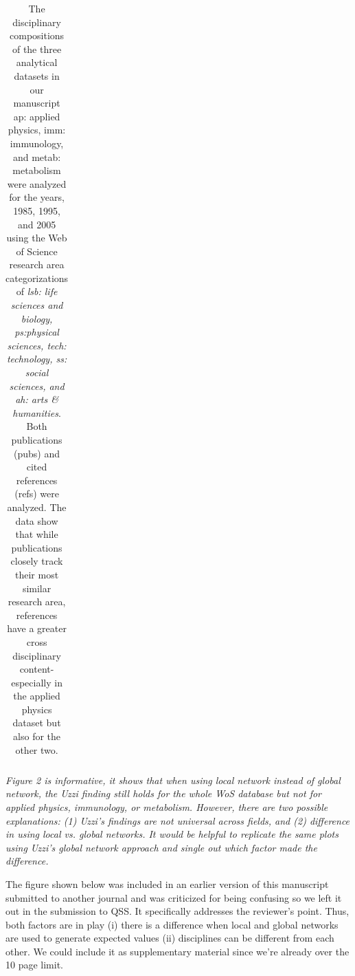 \documentclass[11pt, oneside]{article}   	%
\begin{document}
\begin{table}[ht!]
{\begin{tabular}{|r rllrrrrrrr r|}
   \hline
\end{tabular}
}
\caption{The disciplinary compositions of the three analytical datasets in our manuscript ap: applied physics, imm: immunology, and metab: metabolism were analyzed for the years, 1985, 1995, and 2005 using the Web of Science research area categorizations of \emph{lsb: life sciences and biology, ps:physical sciences, tech: technology, ss: social sciences, and ah: arts \& humanities}. Both publications (pubs) and cited references (refs) were analyzed. The data show that while publications closely track their most similar research area, references have a greater cross disciplinary content- especially in the applied physics dataset but also for the other two. }
\end{table}

\newpage

\emph{Figure 2 is informative, it shows that when using local network instead of global network, the Uzzi finding still holds for the whole WoS database but not for applied physics, immunology, or metabolism. However, there are two possible explanations: (1) Uzzi's findings are not universal across fields, and (2) difference in using local vs. global networks.  It would be helpful to replicate the same plots using Uzzi's global network approach and single out which factor made the difference.}

The figure shown below was included in an earlier version of this manuscript submitted to another journal and was criticized for being confusing so we left it out in the submission to QSS. It specifically addresses the reviewer's point. Thus, both factors are in play (i) there is a difference when local and global networks are used to generate expected values (ii)  disciplines can be different from each other. We could include it as supplementary material since we're already over the 10 page limit. \newpage 
\end{document}
